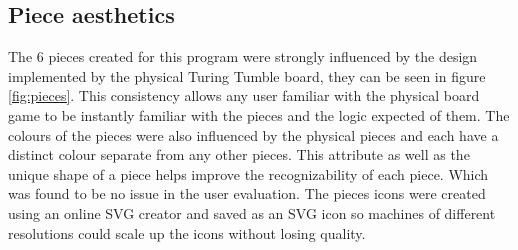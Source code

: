 \documentclass{l4proj}
\begin{document}
\subsection{Piece aesthetics}
The 6 pieces created for this program were strongly influenced by the design implemented by the physical Turing Tumble board, they can be seen in figure \ref{fig:pieces}. This consistency allows any user familiar with the physical board game to be instantly familiar with the pieces and the logic expected of them. The colours of the pieces were also influenced by the physical pieces and each have a distinct colour separate from any other pieces. This attribute as well as the unique shape of a piece helps improve the recognizability of each piece. Which was found to be no issue in the user evaluation. The pieces icons were created using an online SVG creator \cite{noauthor_method_nodate} and saved as an SVG icon so machines of different resolutions could scale up the icons without losing quality. 
\end{document}

